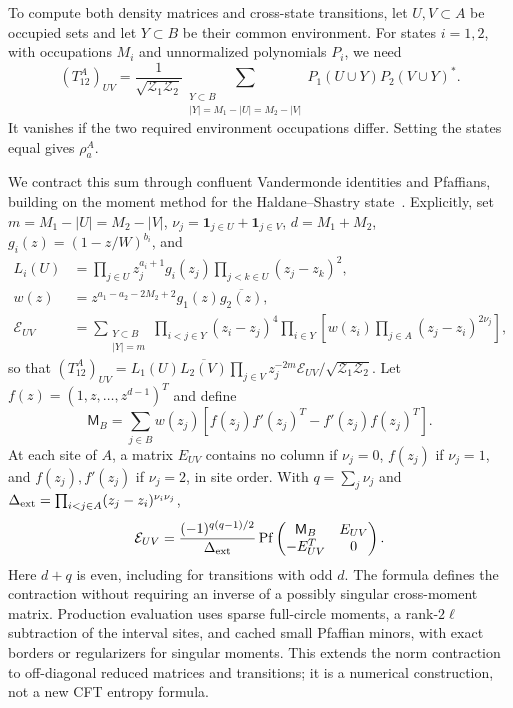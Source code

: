 To compute both density matrices and cross-state transitions,
let $U,V\subset A$ be occupied sets and let $Y\subset B$ be
their common environment. For states $i=1,2$, with occupations
$M_i$ and unnormalized polynomials $P_i$, we need
\begin{equation}
 (T_{12}^A)_{UV}=\frac{1}{\sqrt{\mathcal Z_1\mathcal Z_2}}
 \sum_{\substack{Y\subset B\\|Y|=M_1-|U|=M_2-|V|}}
       P_1(U\cup Y)P_2(V\cup Y)^*.
 \label{eq:num-boson-transition}
\end{equation}
It vanishes if the two required environment occupations differ.
Setting the states equal gives $\rho_a^A$.

We contract this sum through confluent Vandermonde identities
and Pfaffians, building on the moment method for the
Haldane--Shastry state~\cite{numStephan}. Explicitly, set
$m=M_1-|U|=M_2-|V|$, $\nu_j=\mathbf1_{j\in U}+\mathbf1_{j\in V}$,
$d=M_1+M_2$, $g_i(z)=(1-z/W)^{b_i}$, and
\begin{align}
 L_i(U)&=\prod_{j\in U}z_j^{a_i+1}g_i(z_j)
                  \prod_{j<k\in U}(z_j-z_k)^2,\nonumber\\
 w(z)&=z^{a_1-a_2-2M_2+2}g_1(z)\overline{g_2(z)},\nonumber\\
 \mathcal E_{UV}&=\sum_{\substack{Y\subset B\\|Y|=m}}
       \prod_{i<j\in Y}(z_i-z_j)^4
       \prod_{i\in Y}\left[w(z_i)\prod_{j\in A}(z_j-z_i)^{2\nu_j}\right],
 \label{eq:num-environment}
\end{align}
so that $(T_{12}^A)_{UV}=L_1(U)\overline{L_2(V)}
\prod_{j\in V}z_j^{-2m}\mathcal E_{UV}/\sqrt{\mathcal Z_1\mathcal Z_2}$.
Let $f(z)=(1,z,\ldots,z^{d-1})^T$ and define
\begin{equation}
 \mathsf M_B=\sum_{j\in B}w(z_j)
 [f(z_j)f'(z_j)^T-f'(z_j)f(z_j)^T].
 \label{eq:num-moment}
\end{equation}
At each site of $A$, a matrix $E_{UV}$ contains no column if
$\nu_j=0$, $f(z_j)$ if $\nu_j=1$, and $f(z_j),f'(z_j)$ if
$\nu_j=2$, in site order. With $q=\sum_j\nu_j$ and
$\Delta_{\rm ext}=\prod_{i<j\in A}(z_j-z_i)^{\nu_i\nu_j}$,
\begin{equation}
 \mathcal E_{UV}=\frac{(-1)^{q(q-1)/2}}{\Delta_{\rm ext}}
   \operatorname{Pf}\begin{pmatrix}\mathsf M_B&E_{UV}\\-E_{UV}^T&0\end{pmatrix}.
 \label{eq:num-bordered-pf}
\end{equation}
Here $d+q$ is even, including for transitions with odd $d$.
The formula defines the contraction without requiring an
inverse of a possibly singular cross-moment matrix. Production
evaluation uses sparse full-circle moments, a rank-$2\ell$
subtraction of the interval sites, and cached small Pfaffian
minors, with exact borders or regularizers for singular moments.
This extends the norm contraction to off-diagonal reduced
matrices and transitions; it is a numerical construction, not
a new CFT entropy formula.

